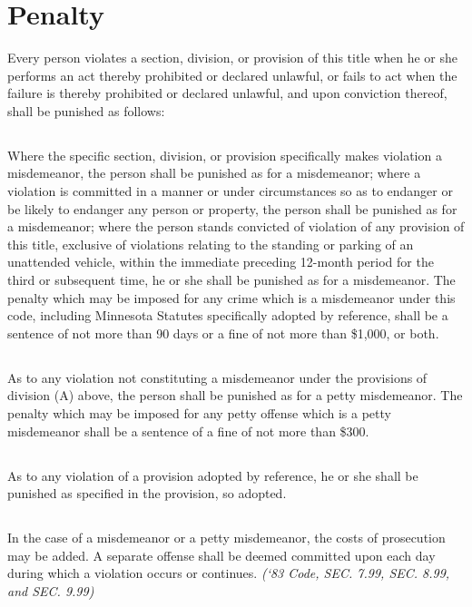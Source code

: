 \documentclass[code.tex]{subfiles}
\begin{document}
\setcounter{section}{98}
\section{Penalty}
Every person violates a section, division, or provision of this title when he or she performs an act thereby prohibited or declared unlawful, or fails to act when the failure is thereby prohibited or declared unlawful, and upon conviction thereof, shall be punished as follows:
\subsection{}
Where the specific section, division, or provision specifically makes violation a misdemeanor, the person shall be punished as for a misdemeanor; where a violation is committed in a manner or under circumstances so as to endanger or be likely to endanger any person or property, the person shall be punished as for a misdemeanor; where the person stands convicted of violation of any provision of this title, exclusive of violations relating to the standing or parking of an unattended vehicle, within the immediate preceding 12-month period for the third or subsequent time, he or she shall be punished as for a misdemeanor.  The penalty which may be imposed for any crime which is a misdemeanor under this code, including Minnesota Statutes specifically adopted by reference, shall be a sentence of not more than 90 days or a fine of not more than \$1,000, or both.
\subsection{}
As to any violation not constituting a misdemeanor under the provisions of division (A) above,  the person shall be punished as for a petty misdemeanor.  The penalty which may be imposed for any petty offense which is a petty misdemeanor shall be a sentence of a fine of not more than \$300.
\subsection{}
As to any violation of a provision adopted by reference, he or she shall be punished as specified in the provision, so adopted.
\subsection{}
In the case of a misdemeanor or a petty misdemeanor, the costs of prosecution may be added.  A separate offense shall be deemed committed upon each day during which a violation occurs or continues.\newline
\emph{(‘83 Code, SEC. 7.99, SEC. 8.99, and SEC. 9.99)}
\end{document}

